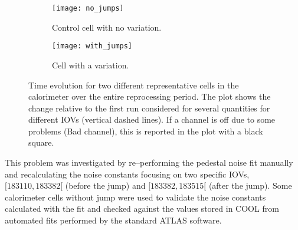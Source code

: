 \begin{figure}[!h]
  \centering
  \begin{subfigure}[t]{.8\linewidth}
    \texttt{[image: no\_jumps]}
    \caption{Control cell with no variation.}
    \label{fig:no_jumps}
  \end{subfigure}
  \begin{subfigure}[t]{.8\linewidth}
    \texttt{[image: with\_jumps]}
    \caption{Cell with a variation.}
    \label{fig:with_jumps}
  \end{subfigure}
  \caption{Time evolution for two different representative cells in the
    calorimeter over the entire reprocessing period. The plot shows the change
    relative to the first run considered for several quantities for different
    IOVs (vertical dashed lines). If a channel is off due to some problems (Bad
    channel), this is reported in the plot with a black square.}
  \label{fig:jumps}
\end{figure}

This problem was investigated by re--performing the pedestal noise fit manually
and recalculating the noise constants focusing on two specific IOVs,
$[183110, 183382[$ (before the jump) and $[183382, 183515[$ (after the
jump). Some calorimeter cells without jump were used to validate the noise
constants calculated with the fit and checked against the values stored in COOL
from automated fits performed by the standard ATLAS software.

